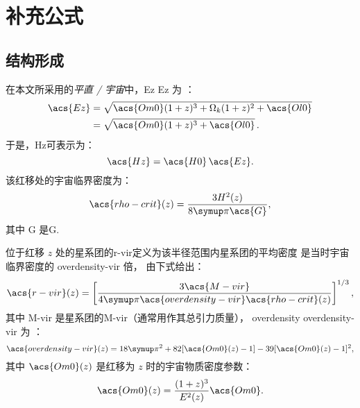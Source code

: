 
\chapter{补充公式}
\label{app:formulas}

\section{结构形成}

在本文所采用的\emph{平直 \lcdm/ 宇宙}中，\acl{Ez} \acs{Ez} 为 \cite{hogg1999}：
\begin{align}
  \label{eq:Ez}
  \acs{Ez}
    & = \sqrt{\acs{Om0} (1+z)^3 + \Omega_k (1+z)^2 + \acs{Ol0}}  \\
    & = \sqrt{\acs{Om0} (1+z)^3 + \acs{Ol0}} \, .
\end{align}
于是，\acl{Hz}可表示为：
\begin{equation}
  \label{eq:hubble-z}
  \acs{Hz} = \acs{H0} \, \acs{Ez} .
\end{equation}
该红移处的宇宙临界密度为：
\begin{equation}
  \label{eq:rho-crit}
  \acs{rho-crit}(z) = \frac{3 H^2(z)}{8 \Cpi \acs{G}} ,
\end{equation}
其中 \acs{G} 是\acl{G}.

位于红移 $z$ 处的星系团的\acf{r-vir}定义为该半径范围内星系团的平均密度
是当时宇宙临界密度的 \acs{overdensity-vir} 倍，
由下式给出：
\begin{equation}
  \label{eq:radius-virial}
  \acs{r-vir}(z) = \left[
    \frac{3 \acs{M-vir}}{4\Cpi \acs{overdensity-vir} \acs{rho-crit}(z)}
  \right]^{1/3},
\end{equation}
其中 \acs{M-vir} 是星系团的\acl{M-vir}（通常用作其总引力质量），
\acf{overdensity} \acs{overdensity-vir} 为 \cite{bryan1998}：
\begin{equation}
  \label{eq:delta-vir}
  \acs{overdensity-vir}(z)
    = 18\Cpi^2 + 82 [\acs{Om0}(z) - 1] - 39 [\acs{Om0}(z) - 1]^2 ,
\end{equation}
其中 $\acs{Om0}(z)$ 是红移为 $z$ 时的宇宙物质密度参数：
\begin{equation}
  \label{eq:omega-m-z}
  \acs{Om0}(z) = \frac{(1+z)^3}{E^2(z)} \acs{Om0} .
\end{equation}


